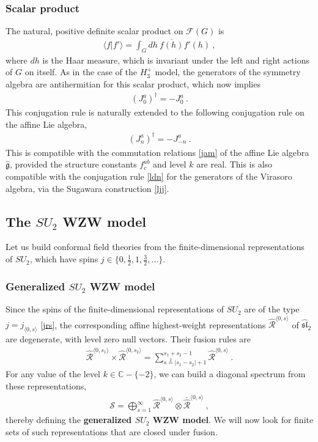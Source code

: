 \documentclass[12pt, a4paper, notitlepage, twoside]{report}
\numberwithin{equation}{section}
\theoremstyle{break}
\begin{document}
\subsubsection{Scalar product}

The natural, positive definite scalar product on $\mathcal{F}(G)$ is 
\begin{align}
 \langle f|f'\rangle = \int_G dh\ \overline{f(h)} f'(h)\ ,
\label{gbg}
\end{align}
where $dh$ is the Haar measure, which is invariant under the left and right actions of $G$ on itself.
As in the case of the $H_3^+$ model, the generators of the symmetry algebra are antihermitian for this scalar product, which now implies
\begin{align}
 (J^a_0)^\dagger = -J^a_0\  . 
\label{jzdj}
\end{align}
This conjugation rule is naturally extended to the following conjugation rule on the affine Lie algebra,
\begin{align}
 \boxed{(J^a_n)^\dagger = -J^a_{-n}}\ .
\end{align}
This is compatible with the commutation relations \eqref{jam} of the affine Lie algebra $\hat{\mathfrak{g}}$, provided the structure constants $f^{ab}_c$ and level $k$ are real.
This is also compatible with the conjugation rule \eqref{ldn} for the generators of the Virasoro algebra, via the Sugawara construction \eqref{ljj}.


\subsection{The \texorpdfstring{$SU_2$}{SU(2)} WZW model \label{secsu}}

Let us build conformal field theories from the finite-dimensional representations of $SU_2$, which have spins $j\in\{0,\frac12,1,\frac32,\dots\}$.

\subsubsection{Generalized $SU_2$ WZW model}

Since the spins of the finite-dimensional representations of $SU_2$ are of the type $j=j_{\langle 0,s\rangle}$ \eqref{jrs}, the 
corresponding affine highest-weight representations $\hat{\mathcal{R}}^{\langle 0,s\rangle}$ of $\widehat{\mathfrak{sl}}_2$ are degenerate, with level zero null vectors.
Their fusion rules are 
\begin{align}
 \hat{\mathcal{R}}^{\langle 0, s_1\rangle}\times\hat{\mathcal{R}}^{\langle 0, s_2\rangle} = \sum_{s\overset{2}{=}|s_1-s_2|+1}^{s_1+s_2-1} \hat{\mathcal{R}}^{\langle 0, s\rangle}\ .
\end{align}
For any value of the level $k\in\mathbb{C}-\{-2\}$, we can build a diagonal spectrum from these representations,
\begin{align}
 \mathcal{S} = \bigoplus_{s=1}^\infty \hat{\mathcal{R}}^{\langle 0, s\rangle}\otimes \bar{\hat{\mathcal{R}}}^{\langle 0, s\rangle}\ ,
\end{align}
thereby defining the \textbf{\boldmath generalized $SU_2$ WZW model}. 
We will now look for finite sets of such representations that are closed under fusion.
\end{document}
